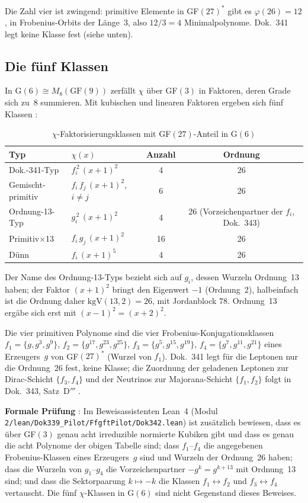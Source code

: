 Die Zahl vier ist zwingend: primitive Elemente in GF$(27)^*$ gibt es
$\varphi(26) = 12$, in Frobenius-Orbits der Länge~3, also $12/3 = 4$
Minimalpolynome. Dok.~341 legt keine Klasse fest (siehe unten).

\subsection{Die fünf Klassen}

In G$(6) \cong M_8(\text{GF}(9))$ zerfällt $\chi$ über GF$(3)$ in Faktoren, deren
Grade sich zu~8 summieren. Mit kubischen und linearen Faktoren ergeben sich
fünf Klassen \BM:

\begin{table}[H]
\centering
\caption{$\chi$-Faktorisierungsklassen mit GF$(27)$-Anteil in G$(6)$}
\begin{tabular}{llcc}
\toprule
Typ & $\chi(x)$ & Anzahl & Ordnung \\
\midrule
Dok.-341-Typ & $f_i^{\,2}\,(x{+}1)^2$ & 4 & 26 \\
Gemischt-primitiv & $f_i\, f_j\,(x{+}1)^2$, $i \neq j$ & 6 & 26 \\
Ordnung-13-Typ & $g_i^{\,2}\,(x{+}1)^2$ & 4 & 26 (Vorzeichenpartner der $f_i$, Dok.~343) \\
Primitiv$\times$13 & $f_i\, g_j\,(x{+}1)^2$ & 16 & 26 \\
Dünn & $f_i\,(x{+}1)^5$ & 4 & 26 \\
\bottomrule
\end{tabular}
\end{table}
\noindent Der Name des Ordnung-13-Typs bezieht sich auf $g_i$, dessen Wurzeln Ordnung~13 haben;
der Faktor $(x+1)^2$ bringt den Eigenwert $-1$ (Ordnung~2), halbeinfach ist die Ordnung daher
$\mathrm{kgV}(13,2)=26$, mit Jordanblock $78$. Ordnung~13 ergäbe sich erst mit $(x-1)^2=(x+2)^2$.

Die vier primitiven Polynome sind die vier Frobenius-Konjugationsklassen
$f_1 = \{g, g^3, g^9\}$, $f_2 = \{g^{17}, g^{23}, g^{25}\}$, $f_3 = \{g^5, g^{15}, g^{19}\}$,
$f_4 = \{g^7, g^{11}, g^{21}\}$ eines Erzeugers~$g$ von GF$(27)^*$ (Wurzel von $f_1$). Dok.~341 legt für die
Leptonen nur die Ordnung~26 fest, keine Klasse; die Zuordnung der geladenen
Leptonen zur Dirac-Schicht $\{f_3,f_4\}$ und der Neutrinos zur Majorana-Schicht
$\{f_1,f_2\}$ folgt in Dok.~343, Satz~D$'''$ \SM.

\noindent\textbf{Formale Prüfung} \LM: Im Beweisassistenten Lean~4 (Modul
\texttt{2/\allowbreak lean/\allowbreak Dok339\_Pilot/\allowbreak FfgftPilot/\allowbreak Dok342.lean}) ist zusätzlich bewiesen,
dass es über GF$(3)$ genau acht irreduzible normierte Kubiken gibt und dass es
genau die acht Polynome der obigen Tabelle sind; dass $f_1$--$f_4$ die
angegebenen Frobenius-Klassen eines Erzeugers~$g$ sind und Wurzeln der
Ordnung~26 haben; dass die Wurzeln von $g_1$--$g_4$ die Vorzeichenpartner
$-g^k=g^{k+13}$ mit Ordnung~13 sind; und dass die Sektorpaarung $k\mapsto-k$
die Klassen $f_1\leftrightarrow f_2$ und $f_3\leftrightarrow f_4$ vertauscht.
Die fünf $\chi$-Klassen in G$(6)$ sind nicht Gegenstand dieses Beweises.

